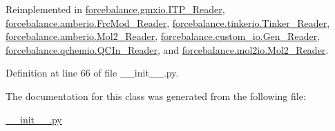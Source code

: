 \-Reimplemented in \hyperlink{classforcebalance_1_1gmxio_1_1ITP__Reader_ab35c32e7ecf74028641613f90906bd37}{forcebalance.\-gmxio.\-I\-T\-P\-\_\-\-Reader}, \hyperlink{classforcebalance_1_1amberio_1_1FrcMod__Reader_ad25c7e07aadb587268f3beb7a379766c}{forcebalance.\-amberio.\-Frc\-Mod\-\_\-\-Reader}, \hyperlink{classforcebalance_1_1tinkerio_1_1Tinker__Reader_a7078ca5338dff178edf5afb05a1f32c8}{forcebalance.\-tinkerio.\-Tinker\-\_\-\-Reader}, \hyperlink{classforcebalance_1_1amberio_1_1Mol2__Reader_a76b4f0ec6731d7072da6be5768ebf979}{forcebalance.\-amberio.\-Mol2\-\_\-\-Reader}, \hyperlink{classforcebalance_1_1custom__io_1_1Gen__Reader_a408f5717e02bcc0d87b8e60bd8b0714e}{forcebalance.\-custom\-\_\-io.\-Gen\-\_\-\-Reader}, \hyperlink{classforcebalance_1_1qchemio_1_1QCIn__Reader_a1ff6018724f2760bb6dd32dd3c854328}{forcebalance.\-qchemio.\-Q\-C\-In\-\_\-\-Reader}, and \hyperlink{classforcebalance_1_1mol2io_1_1Mol2__Reader_a39adb792b05aab536e3376ecf2ec5778}{forcebalance.\-mol2io.\-Mol2\-\_\-\-Reader}.



\-Definition at line 66 of file \-\_\-\-\_\-init\-\_\-\-\_\-.\-py.



\-The documentation for this class was generated from the following file\-:\begin{DoxyCompactItemize}
\item 
\hyperlink{____init_____8py}{\-\_\-\-\_\-init\-\_\-\-\_\-.\-py}\end{DoxyCompactItemize}
